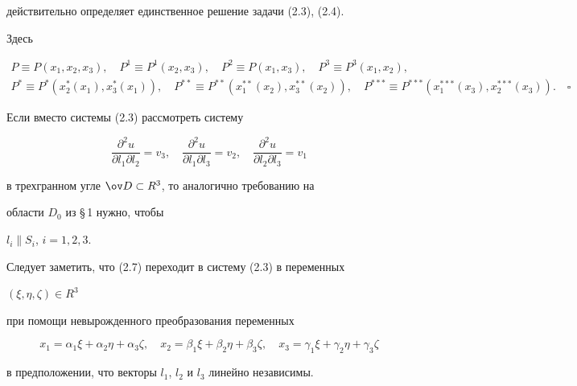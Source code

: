 действительно определяет единственное решение задачи (2.3), (2.4).


Здесь


\begin{gather*}


P\equiv P(x_1,x_2,x_3),\quad P^1\equiv P^1(x_2,x_3),\quad


P^2\equiv P(x_1,x_3),\quad P^3\equiv P^3(x_1,x_2), \\


%


P^*\equiv P^*(x^*_2(x_1),x^*_3(x_1)),\quad


P^{**}\equiv P^{**}(x^{**}_1(x_2),x^{**}_3(x_2)),\quad


P^{*{*}*}\equiv P^{*{*}*}(x^{*{*}*}_1(x_3),x^{*{*}*}_2(x_3)).


\quad\square


\end{gather*}





\begin{notes}


Если вместо системы (2.3) рассмотреть систему


\begin{equation}


\frac{\partial^2u}{\partial l_1\partial l_2}=v_3,\quad


\frac{\partial^2u}{\partial l_1\partial l_3}=v_2,\quad


\frac{\partial^2u}{\partial l_2\partial l_3}=v_1


\end{equation}


в трехгранном угле $\ov D\subset R^3$, то аналогично требованию на


области $D_0$ из \S\,1 нужно, чтобы


$l_i\parallel S_i$, $i=1,2,3$.





Следует заметить, что (2.7) переходит в систему (2.3) в переменных


$(\xi,\eta,\zeta)\in R^3$


при помощи невырожденного преобразования переменных


$$


x_1=\alpha_1\xi+\alpha_2\eta+\alpha_3\zeta,\quad


x_2=\beta_1\xi+\beta_2\eta+\beta_3\zeta,\quad


x_3=\gamma_1\xi+\gamma_2\eta+\gamma_3\zeta


$$


в предположении, что векторы $l_1$, $l_2$ и $l_3$ линейно независимы.


\end{notes}






